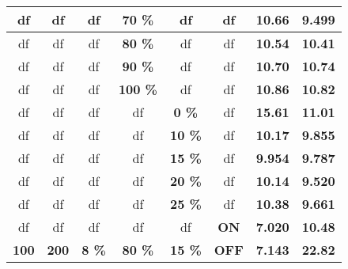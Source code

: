 \begin{table}[!]
\begin{tabular}{|c|c|c|c|c|c|c|c|}
df                   & df                   & df                     & \textbf{70 \%}          & df                   & df                    & \textbf{10.66}       & \textbf{9.499}                 \\ \hline
df                   & df                   & df                     & \textbf{80 \%}          & df                   & df                    & \textbf{10.54}       & \textbf{10.41}                \\ \hline
df                   & df                   & df                     & \textbf{90 \%}          & df                   & df                    & \textbf{10.70}       & \textbf{10.74}                \\ \hline
df                   & df                   & df                     & \textbf{100 \%}         & df                   & df                    & \textbf{10.86}       & \textbf{10.82}                \\ \hline
df                   & df                   & df                     & df                      & \textbf{0 \%}        & df                    & \textbf{15.61}       & \textbf{11.01}                \\ \hline
df                   & df                   & df                     & df                      & \textbf{10 \%}       & df                    & \textbf{10.17}       & \textbf{9.855}                 \\ \hline
df                   & df                   & df                     & df                      & \textbf{15 \%}       & df                    & \textbf{9.954}        & \textbf{9.787}                 \\ \hline
df                   & df                   & df                     & df                      & \textbf{20 \%}       & df                    & \textbf{10.14}       & \textbf{9.520}                 \\ \hline
df                   & df                   & df                     & df                      & \textbf{25 \%}       & df                    & \textbf{10.38}       & \textbf{9.661}                 \\ \hline
df                   & df                   & df                     & df                      & df                   & \textbf{ON}           & \textbf{7.020}        & \textbf{10.48}                \\ \hline
\textbf{100}         & \textbf{200}         & \textbf{8 \%}          & \textbf{80 \%}          & \textbf{15 \%}       & \textbf{OFF}          & \textbf{7.143}        & \textbf{22.82}                \\ \hline

\end{tabular}
\end{table}
